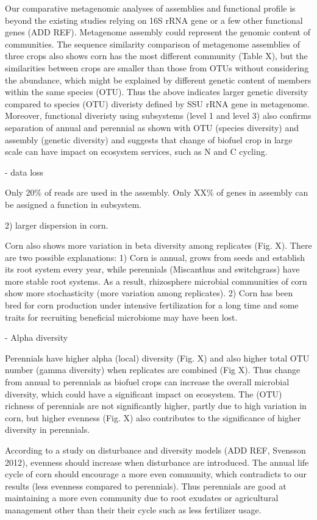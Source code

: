 \documentclass[12pt]{article}
\begin{document}
Our comparative metagenomic analyses of assemblies and functional profile is beyond the existing studies relying on 16S rRNA gene or a few other functional genes (ADD REF). Metagenome assembly could represent the genomic content of communities. The sequence similarity comparison of metagenome assemblies of three crops also shows corn has the most different community (Table X), but the similarities between crops are smaller than those from OTUs without considering the abundance, which might be explained by different genetic content of members within the same species (OTU). Thus the above indicates larger genetic diversity compared to species (OTU) diveristy defined by SSU rRNA gene in metagenome. Moreover, functional diveristy using subsystems (level 1 and level 3) also confirms separation of annual and perennial as shown with OTU (species diversity) and assembly (genetic diversity) and suggests that change of biofuel crop in large scale can have impact on ecosystem services, such as N and C cycling.

- data loss

Only 20\% of reads are used in the assembly. Only XX\% of genes in assembly can be assigned a function in subsystem.

2) larger dispersion in corn.

Corn also shows more variation in beta diversity among replicates (Fig. X). There are two possible explanations: 1) Corn is annual, grows from seeds and establish its root system every year, while perennials (Miscanthus and switchgrass) have more stable root systems. As a result, rhizosphere microbial communities of corn show more stochasticity (more variation among replicates). 2) Corn has been bred for corn production under intensive fertilization for a long time and some traits for recruiting beneficial microbiome may have been lost.

- Alpha diversity

Perennials have higher alpha (local) diversity (Fig. X) and also higher total OTU number (gamma diversity) when replicates are combined (Fig X). Thus change from annual to perennials as biofuel crops can increase the overall microbial diversity, which could have a significant impact on ecosystem. The (OTU) richness of perennials are not significantly higher, partly due to high variation in corn, but higher evenness (Fig. X) also contributes to the significance of higher diversity in perennials. 

According to a study on disturbance and diversity models (ADD REF, Svensson 2012), evenness should increase when disturbance are introduced. The annual life cycle of corn should encourage a more even community, which contradicts to our results (less evenness compared to perennials). Thus perennials are good at maintaining a more even community due to root exudates or agricultural management other than their their cycle such as less fertilizer usage.
\end{document}
